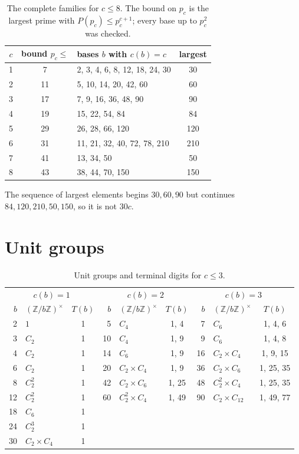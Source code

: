 \documentclass[11pt]{article}
\theoremstyle{remark}
\newcommand{\Z}{\mathbb{Z}}
\newcommand{\U}[1]{(\Z/#1\Z)^{\times}}
\begin{document}
\begin{table}[h]
\centering
\begin{tabular}{@{}cclc@{}}
\toprule
$c$ & bound $p_c\le$ & bases $b$ with $c(b)=c$ & largest \\
\midrule
1 & 7  & 2, 3, 4, 6, 8, 12, 18, 24, 30 & 30 \\
2 & 11 & 5, 10, 14, 20, 42, 60 & 60 \\
3 & 17 & 7, 9, 16, 36, 48, 90 & 90 \\
4 & 19 & 15, 22, 54, 84 & 84 \\
5 & 29 & 26, 28, 66, 120 & 120 \\
6 & 31 & 11, 21, 32, 40, 72, 78, 210 & 210 \\
7 & 41 & 13, 34, 50 & 50 \\
8 & 43 & 38, 44, 70, 150 & 150 \\
\bottomrule
\end{tabular}
\caption{The complete families for $c\le 8$. The bound on $p_c$ is the largest prime with $P(p_c)\le p_c^{c+1}$; every base up to $p_c^2$ was checked.}
\end{table}

The sequence of largest elements begins $30,60,90$ but continues $84,120,210,50,150$, so it is not $30c$.

\section{Unit groups}

\begin{table}[h]
\centering
\begin{tabular}{@{}rlc@{\qquad}rlc@{\qquad}rlc@{}}
\toprule
\multicolumn{3}{c}{$c(b)=1$} & \multicolumn{3}{c}{$c(b)=2$} & \multicolumn{3}{c}{$c(b)=3$}\\
$b$ & $\U{b}$ & $T(b)$ & $b$ & $\U{b}$ & $T(b)$ & $b$ & $\U{b}$ & $T(b)$\\
\midrule
2  & $1$ & 1 & 5  & $C_4$ & 1, 4 & 7  & $C_6$ & 1, 4, 6\\
3  & $C_2$ & 1 & 10 & $C_4$ & 1, 9 & 9  & $C_6$ & 1, 4, 8\\
4  & $C_2$ & 1 & 14 & $C_6$ & 1, 9 & 16 & $C_2\times C_4$ & 1, 9, 15\\
6  & $C_2$ & 1 & 20 & $C_2\times C_4$ & 1, 9 & 36 & $C_2\times C_6$ & 1, 25, 35\\
8  & $C_2^2$ & 1 & 42 & $C_2\times C_6$ & 1, 25 & 48 & $C_2^2\times C_4$ & 1, 25, 35\\
12 & $C_2^2$ & 1 & 60 & $C_2^2\times C_4$ & 1, 49 & 90 & $C_2\times C_{12}$ & 1, 49, 77\\
18 & $C_6$ & 1 \\
24 & $C_2^3$ & 1 \\
30 & $C_2\times C_4$ & 1 \\
\bottomrule
\end{tabular}
\caption{Unit groups and terminal digits for $c\le 3$.}
\end{table}
\end{document}
